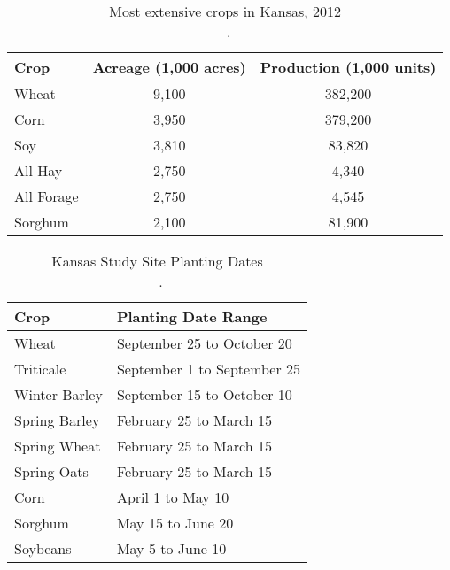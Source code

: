 \begin{Spacing}{1.0}
\begin{table}
  \centering
  \caption[Most extensive crops in Kansas, 2012.]{Most extensive crops in Kansas, 2012\\~\autocite[adapted from][]{usda2013kansascrops}.}
  \label{table:kansas}
  \begin{tabu}{lcc}
    \toprule
    \textbf{Crop} & \textbf{Acreage (1,000 acres)} & \textbf{Production (1,000 units)} \\
    \midrule
    Wheat & 9,100 & 382,200 \\
    Corn & 3,950 & 379,200 \\
    Soy & 3,810 & 83,820 \\
    All Hay & 2,750 & 4,340 \\
    All Forage & 2,750 & 4,545 \\
    Sorghum & 2,100 & 81,900 \\      
    \bottomrule
  \end{tabu}
\end{table}
\end{Spacing}


\begin{Spacing}{1.0}
\begin{table}
  \centering
  \caption[Kansas Study Site Planting Dates]{Kansas Study Site Planting Dates\\~\autocite[adapted from][]{shroyer1996kansas}.}
  \label{table:KSplantingdates}
  \begin{tabu} to 4.5in {X[1,m,c]X[2,m,c]}
    \toprule
    \textbf{Crop} & \textbf{Planting Date Range} \\
    \midrule
    Wheat & September 25 to October 20 \\
    Triticale & September 1 to September 25 \\
    Winter Barley & September 15 to October 10 \\
    Spring Barley & February 25 to March 15 \\
    Spring Wheat & February 25 to March 15 \\
    Spring Oats & February 25 to March 15 \\
    Corn & April 1 to May 10 \\
    Sorghum & May 15 to June 20 \\
    Soybeans & May 5 to June 10 \\
    \bottomrule
  \end{tabu}
\end{table}
\end{Spacing}



